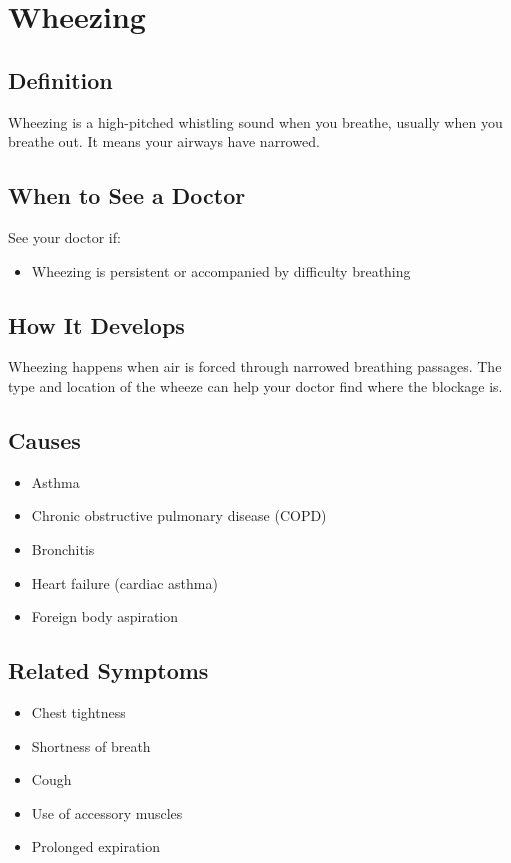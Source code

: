 \chapter{Wheezing}

\section*{Definition}
Wheezing is a high-pitched whistling sound when you breathe, usually when you breathe out. It means your airways have narrowed.

\section*{When to See a Doctor}
See your doctor if:
\begin{itemize}
  \item Wheezing is persistent or accompanied by difficulty breathing
\end{itemize}

\section*{How It Develops}
Wheezing happens when air is forced through narrowed breathing passages. The type and location of the wheeze can help your doctor find where the blockage is.

\section*{Causes}
\begin{itemize}
  \item Asthma
  \item Chronic obstructive pulmonary disease (COPD)
  \item Bronchitis
  \item Heart failure (cardiac asthma)
  \item Foreign body aspiration
\end{itemize}

\section*{Related Symptoms}
\begin{itemize}
  \item Chest tightness
  \item Shortness of breath
  \item Cough
  \item Use of accessory muscles
  \item Prolonged expiration
\end{itemize}


